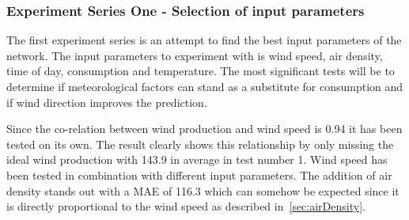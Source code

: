 \subsubsection{Experiment Series One - Selection of input parameters}
The first experiment series is an attempt to find the best input parameters of the network. The input parameters to experiment with is wind speed, air density, time of day, consumption and temperature. The most significant tests will be to determine if meteorological factors can stand as a substitute for consumption and if wind direction improves the prediction.


\begin{table}[H]
\centering  %
\caption{Table showing the difference between using consumption and meteorological factors} %
\label{table:consumptionInclusionTable} %
\end{table}

Since the co-relation between wind production and wind speed is 0.94 it has been tested on its own. The result clearly shows this relationship by only missing the ideal wind production with 143.9 in average in test number 1. Wind speed has been tested in combination with different input parameters. The addition of air density stands out with a MAE of 116.3 which can somehow be expected since it is directly proportional to the wind speed as described in~\ref{sec:airDensity}. 

